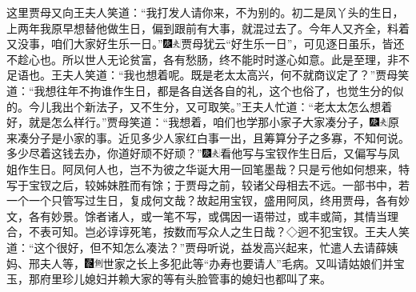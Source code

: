 这里贾母又向王夫人笑道：``我打发人请你来，不为别的。初二是凤丫头的生日，上两年我原早想替他做生日，偏到跟前有大事，就混过去了。今年人又齐全，料着又没事，咱们大家好生乐一日。''{\includegraphics[width=3mm]{../Images/00004}\includegraphics[width=3mm]{../Images/00012}\footnotesize \kaishu 贾母犹云``好生乐一日''，可见逐日虽乐，皆还不趁心也。所以世人无论贫富，各有愁肠，终不能时时遂心如意。此是至理，非不足语也。}王夫人笑道：``我也想着呢。既是老太太高兴，何不就商议定了？''贾母笑道：``我想往年不拘谁作生日，都是各自送各自的礼，这个也俗了，也觉生分的似的。今儿我出个新法子，又不生分，又可取笑。''王夫人忙道：``老太太怎么想着好，就是怎么样行。''贾母笑道：``我想着，咱们也学那小家子大家凑分子，{\includegraphics[width=3mm]{../Images/00004}\includegraphics[width=3mm]{../Images/00012}\footnotesize \kaishu 原来凑分子是小家的事。近见多少人家红白事一出，且筹算分子之多寡，不知何说。}多少尽着这钱去办，你道好顽不好顽？''{\includegraphics[width=3mm]{../Images/00004}\includegraphics[width=3mm]{../Images/00012}\footnotesize \kaishu 看他写与宝钗作生日后，又偏写与凤姐作生日。阿凤何人也，岂不为彼之华诞大用一回笔墨哉？只是亏他如何想来，特写于宝钗之后，较姊妹胜而有馀；于贾母之前，较诸父母相去不远。一部书中，若一个一个只管写过生日，复成何文哉？故起用宝钗，盛用阿凤，终用贾母，各有妙文，各有妙景。馀者诸人，或一笔不写，或偶因一语带过，或丰或简，其情当理合，不表可知。岂必谆谆死笔，按数而写众人之生日哉？◇迥不犯宝钗。}王夫人笑道：``这个很好，但不知怎么凑法？''贾母听说，益发高兴起来，忙遣人去请薛姨妈、邢夫人等，{\includegraphics[width=3mm]{../Images/00006}\includegraphics[width=3mm]{../Images/00011}\footnotesize \kaishu 世家之长上多犯此等``办寿也要请人''毛病。}又叫请姑娘们并宝玉，那府里珍儿媳妇并赖大家的等有头脸管事的媳妇也都叫了来。

